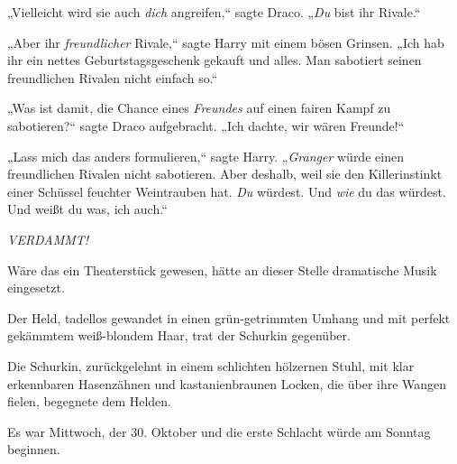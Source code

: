 „Vielleicht wird sie auch \emph{dich} angreifen,“ sagte Draco. „\emph{Du} bist ihr Rivale.“

„Aber ihr \emph{freundlicher} Rivale,“ sagte Harry mit einem bösen Grinsen. „Ich hab ihr ein nettes Geburtstagsgeschenk gekauft und alles. Man sabotiert seinen freundlichen Rivalen nicht einfach so.“

„Was ist damit, die Chance eines \emph{Freundes} auf einen fairen Kampf zu sabotieren?“ sagte Draco aufgebracht. „Ich dachte, wir wären Freunde!“

„Lass mich das anders formulieren,“ sagte Harry. „\emph{Granger} würde einen freundlichen Rivalen nicht sabotieren. Aber deshalb, weil sie den Killerinstinkt einer Schüssel feuchter Weintrauben hat. \emph{Du} würdest. Und \emph{wie} du das würdest. Und weißt du was, ich auch.“

\emph{VERDAMMT!}

\later

Wäre das ein Theaterstück gewesen, hätte an dieser Stelle dramatische Musik eingesetzt.

Der Held, tadellos gewandet in einen grün-getrimmten Umhang und mit perfekt gekämmtem weiß-blondem Haar, trat der Schurkin gegenüber.

Die Schurkin, zurückgelehnt in einem schlichten hölzernen Stuhl, mit klar erkennbaren Hasenzähnen und kastanienbraunen Locken, die über ihre Wangen fielen, begegnete dem Helden.

Es war Mittwoch, der 30. Oktober und die erste Schlacht würde am Sonntag beginnen.

